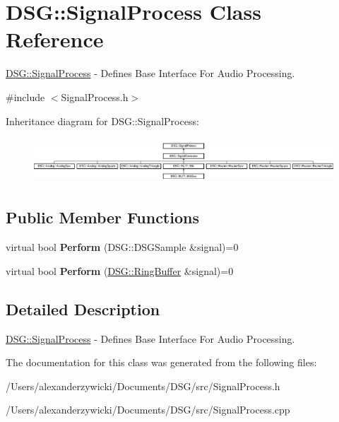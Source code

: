 \hypertarget{class_d_s_g_1_1_signal_process}{\section{D\+S\+G\+:\+:Signal\+Process Class Reference}
\label{class_d_s_g_1_1_signal_process}
}


\hyperlink{class_d_s_g_1_1_signal_process}{D\+S\+G\+::\+Signal\+Process} -\/ Defines Base Interface For Audio Processing.  




{\ttfamily \#include $<$Signal\+Process.\+h$>$}

Inheritance diagram for D\+S\+G\+:\+:Signal\+Process\+:\begin{figure}[H]
\begin{center}
\leavevmode
\includegraphics[height=1.702128cm]{class_d_s_g_1_1_signal_process}
\end{center}
\end{figure}
\subsection*{Public Member Functions}
\begin{DoxyCompactItemize}
\item 
\hypertarget{class_d_s_g_1_1_signal_process_af73d246c460915db7a9be7e3ef36844d}{virtual bool {\bfseries Perform} (D\+S\+G\+::\+D\+S\+G\+Sample \&signal)=0}\label{class_d_s_g_1_1_signal_process_af73d246c460915db7a9be7e3ef36844d}

\item 
\hypertarget{class_d_s_g_1_1_signal_process_a2c8ff3487d9c43f9eace1d9192d4a37e}{virtual bool {\bfseries Perform} (\hyperlink{class_d_s_g_1_1_ring_buffer}{D\+S\+G\+::\+Ring\+Buffer} \&signal)=0}\label{class_d_s_g_1_1_signal_process_a2c8ff3487d9c43f9eace1d9192d4a37e}

\end{DoxyCompactItemize}


\subsection{Detailed Description}
\hyperlink{class_d_s_g_1_1_signal_process}{D\+S\+G\+::\+Signal\+Process} -\/ Defines Base Interface For Audio Processing. 

The documentation for this class was generated from the following files\+:\begin{DoxyCompactItemize}
\item 
/\+Users/alexanderzywicki/\+Documents/\+D\+S\+G/src/Signal\+Process.\+h\item 
/\+Users/alexanderzywicki/\+Documents/\+D\+S\+G/src/Signal\+Process.\+cpp\end{DoxyCompactItemize}
